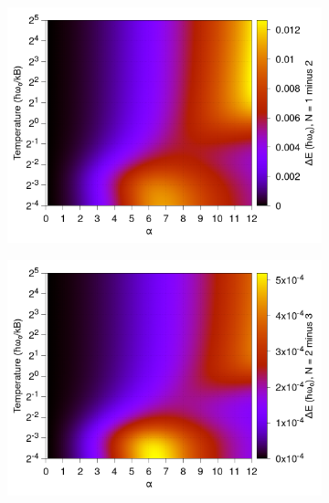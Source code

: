 \begin{figure}[!tbp]
\begin{subfigure}[b]{0.49\textwidth}
    \includegraphics[width=\textwidth]{figures/frohlich-3d-energy-alpha-0to12-temp-00625to32-N-1minus2-contourf.png}
  \end{subfigure}
  \begin{subfigure}[b]{0.49\textwidth}
    \centering
    \includegraphics[width=\textwidth]{figures/frohlich-3d-energy-alpha-0to12-temp-00625to32-N-2minus3-contourf.png}
  \end{subfigure}

\end{figure}
